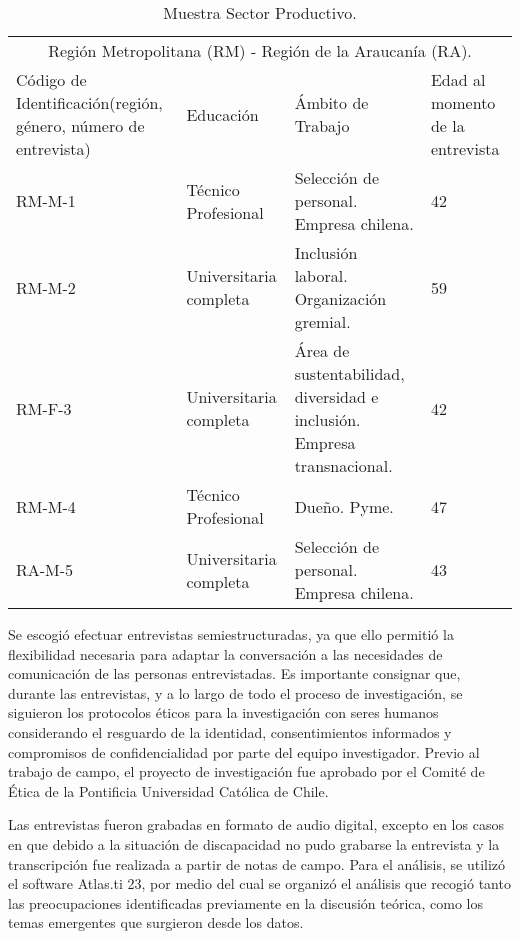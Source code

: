 \begin{table}[!htpb]
\centering
\small
\begin{threeparttable}
\caption{Muestra Sector Productivo.}\label{tab-02}
\begin{tabular}{l>{\raggedright}p{}>{\raggedright}p{}l}
\toprule
\multicolumn{4}{c}{Región Metropolitana (RM) - Región de la Araucanía (RA).}\\		
\multicolumn{1}{p{0.2\textwidth}}{Código de Identificación(región, género, número de entrevista)} &
Educación & Ámbito de Trabajo & \multicolumn{1}{p{0.2\textwidth}}{Edad al momento de la entrevista} \\
\midrule
RM-M-1 & Técnico Profesional & Selección de personal. Empresa chilena. &
42 \\
RM-M-2 & Universitaria completa & Inclusión laboral.	
Organización gremial. & 59 \\
RM-F-3 & Universitaria completa & Área de sustentabilidad, diversidad e
inclusión.		
Empresa transnacional. & 42 \\
RM-M-4 & Técnico Profesional & Dueño.
Pyme. & 47 \\
RA-M-5 & Universitaria completa & Selección de personal. Empresa
chilena. & 43 \\
\bottomrule
\end{tabular}
\end{threeparttable}
\end{table}


Se escogió efectuar entrevistas semiestructuradas, ya que ello permitió
la flexibilidad necesaria para adaptar la conversación a las necesidades
de comunicación de las personas entrevistadas. Es importante consignar
que, durante las entrevistas, y a lo largo de todo el proceso de
investigación, se siguieron los protocolos éticos para la investigación
con seres humanos considerando el resguardo de la identidad,
consentimientos informados y compromisos de confidencialidad por parte
del equipo investigador. Previo al trabajo de campo, el proyecto de
investigación fue aprobado por el Comité de Ética de la Pontificia
Universidad Católica de Chile.

Las entrevistas fueron grabadas en formato de audio digital, excepto en
los casos en que debido a la situación de discapacidad no pudo grabarse
la entrevista y la transcripción fue realizada a partir de notas de
campo. Para el análisis, se utilizó el software Atlas.ti 23, por medio
del cual se organizó el análisis que recogió tanto las preocupaciones
identificadas previamente en la discusión teórica, como los temas
emergentes que surgieron desde los datos.
